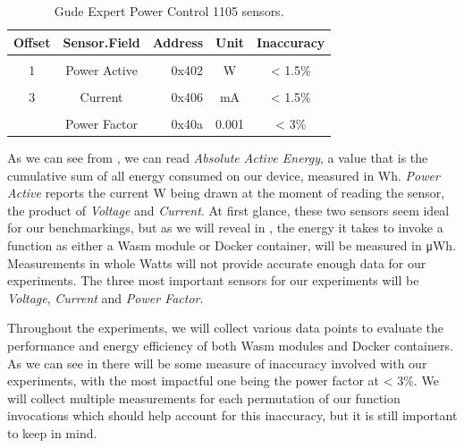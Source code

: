 \documentclass[
  table]{report}
\begin{document}
\begin{table}[H]
\centering
\caption{\label{tab:unnamed-chunk-1}Gude Expert Power Control 1105 sensors. \label{tab:gude_config}}
\centering
\begin{tabular}[t]{ccrcc}
\toprule
Offset & Sensor.Field & Address & Unit & Inaccuracy\\
\midrule
\cellcolor{gray!10}{0} & \cellcolor{gray!10}{Absolute Active Energy} & \cellcolor{gray!10}{0x400} & \cellcolor{gray!10}{Wh} & \cellcolor{gray!10}{< 1.5\%}\\
1 & Power Active & 0x402 & W & < 1.5\%\\
\cellcolor{gray!10}{2} & \cellcolor{gray!10}{Voltage} & \cellcolor{gray!10}{0x404} & \cellcolor{gray!10}{V} & \cellcolor{gray!10}{< 1\%}\\
3 & Current & 0x406 & mA & < 1.5\%\\
\cellcolor{gray!10}{4} & \cellcolor{gray!10}{Frequency} & \cellcolor{gray!10}{0x408} & \cellcolor{gray!10}{0.01hz} & \cellcolor{gray!10}{< 0.03\%}\\
\addlinespace
5 & Power Factor & 0x40a & 0.001 & < 3\%\\
\bottomrule
\end{tabular}
\end{table}

As we can see from , we can read \emph{Absolute
Active Energy}, a value that is the cumulative sum of all energy
consumed on our device, measured in Wh. \emph{Power Active} reports the
current W being drawn at the moment of reading the sensor, the product
of \emph{Voltage} and \emph{Current}. At first glance, these two sensors
seem ideal for our benchmarkings, but as we will reveal in
, the energy it takes to invoke a function as either
a \ac{Wasm} module or Docker container, will be measured in μWh.
Measurements in whole Watts will not provide accurate enough data for
our experiments. The three most important sensors for our experiments
will be \emph{Voltage}, \emph{Current} and \emph{Power Factor}.

Throughout the experiments, we will collect various data points to
evaluate the performance and energy efficiency of both \ac{Wasm} modules
and Docker containers. As we can see in  there
will be some measure of inaccuracy involved with our experiments, with
the most impactful one being the power factor at \textless{} 3\%. We
will collect multiple measurements for each permutation of our function
invocations which should help account for this inaccuracy, but it is
still important to keep in mind.
\end{document}

